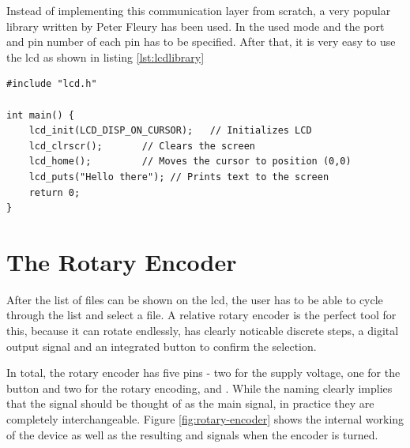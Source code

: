 Instead of implementing this communication layer from scratch, a very popular library written by Peter Fleury has been used. In  the used mode and the port and pin number of each pin has to be specified. After that, it is very easy to use the \gls{lcd} as shown in listing \ref{lst:lcdlibrary}

\begin{lstlisting}[caption=LCD Library, label=lst:lcdlibrary]
#include "lcd.h"

int main() {
    lcd_init(LCD_DISP_ON_CURSOR);   // Initializes LCD
    lcd_clrscr();       // Clears the screen
    lcd_home();         // Moves the cursor to position (0,0)
    lcd_puts("Hello there"); // Prints text to the screen
    return 0;
}
\end{lstlisting}

\section{The Rotary Encoder}

After the list of files can be shown on the \gls{lcd}, the user has to be able to cycle through the list and select a file. A relative rotary encoder is the perfect tool for this, because it can rotate endlessly, has clearly noticable discrete steps, a digital output signal and an integrated button to confirm the selection.

In total, the rotary encoder has five pins - two for the supply voltage, one for the button and two for the rotary encoding,  and . While the naming clearly implies that the  signal should be thought of as the main signal, in practice they are completely interchangeable. Figure \ref{fig:rotary-encoder} shows the internal working of the device as well as the resulting  and  signals when the encoder is turned.

